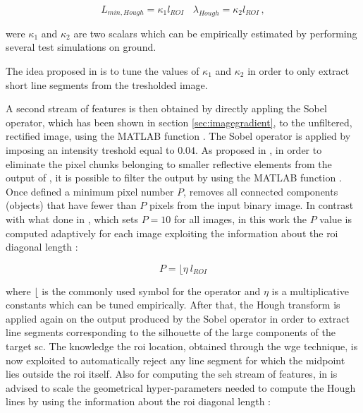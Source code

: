 \begin{equation*}
  L_{min,Hough} = \kappa_1 l_{ROI} \ \ \ \  \lambda_{Hough} = \kappa_2 l_{ROI}  \,,
\end{equation*}

were $\kappa_1$ and $\kappa_2$ are two scalars which can be empirically estimated by performing several test simulations on ground.

The idea proposed in \cite{Sharma2018} is to tune the values of $\kappa_1$ and $\kappa_2$ in order to only extract short line segments from the tresholded image.

A second stream of features is then obtained by directly appling the Sobel operator, which has been shown in section \ref{sec:imagegradient}, to the unfiltered, rectified image, using the MATLAB function . The Sobel operator is applied by imposing an intensity treshold equal to $0.04$. As proposed in \cite{fracchio2019}, in order to eliminate the pixel chunks belonging to smaller reflective elements from the output of , it is possible to filter the output by using the MATLAB function . Once defined a minimum pixel number $P$,  removes all connected components (objects) that have fewer than $P$ pixels from the input binary image. In contrast with what done in \cite{fracchio2019}, which sets $P = 10$ for all images, in this work the $P$ value is computed adaptively for each image exploiting the information about the \acrshort{roi} diagonal length :

\begin{equation*}
  P = \lfloor \eta \ l_{ROI}
\end{equation*}

where $\lfloor$ is the commonly used symbol for the  operator and $\eta$ is a multiplicative constants which can be tuned empirically.
After that, the Hough transform is applied again on the output produced by the Sobel operator in order to extract line segments corresponding to the silhouette of the large components of the target \acrshort{sc}. The knowledge the \acrshort{roi} location, obtained through the \acrshort{wge} technique, is now exploited to automatically reject any line segment for which the midpoint lies outside the \acrshort{roi} itself. Also for computing the \acrfull{seh} stream of features, in \cite{Sharma2018} is advised to scale the geometrical hyper-parameters needed to compute the Hough lines by using the information about the \acrshort{roi} diagonal length :

